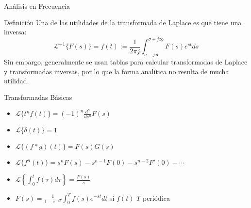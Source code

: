 \documentclass[
    10pt,
    aspectratio=169,
    xcolor={dvipsnames},
    spanish,
    ]{beamer}
\begin{document}
\begin{frame}{Análisis en Frecuencia}
\begin{block}{Definición}
  \footnotesize
  Una de las utilidades de la transformada de Laplace es que tiene una inversa:
  $$\mathcal{L}^{-1}\{F(s)\} = f(t) := \frac{1}{2\pi j} \int_{\sigma-j\infty}^{\sigma+j\infty} F(s)e^{st}ds$$
  Sin embargo, generalmente se usan tablas para calcular transformadas de Laplace y transformadas inversas, por lo que la forma analítica no resulta de mucha utilidad.
\end{block}

\begin{block}{Transformadas Básicas}
  \footnotesize
  \begin{itemize}
    \item $\mathcal{L}\{t^n f(t)\} = (-1)^n \frac{d^n}{ds^n} F(s)$
    \item $\mathcal{L}\{\delta(t)\} = 1$
    \item $\mathcal{L}\{(f * g)(t)\} = F(s)G(s)$
    \item $\mathcal{L}\{f^n(t)\} = s^n F(s) - s^{n-1}F(0) - s^{n-2}F'(0) - \cdots$
    \item $\mathcal{L}\left\{\int_0^t f(\tau)d\tau\right\} = \frac{F(s)}{s}$
    \item $F(s) = \frac{1}{1-e^{-sT}} \int_0^T f(s)e^{-st}dt$ si $f(t)$ $T$ periódica
  \end{itemize}
\end{block}
\end{frame}



\end{document}
